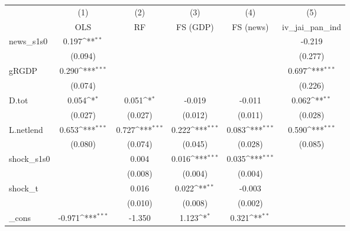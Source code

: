 {
\def\sym#1{\ifmmode^{#1}\else\(^{#1}\)\fi}
\begin{tabular}{l*{5}{c}}
\toprule
            &\multicolumn{1}{c}{(1)}&\multicolumn{1}{c}{(2)}&\multicolumn{1}{c}{(3)}&\multicolumn{1}{c}{(4)}&\multicolumn{1}{c}{(5)}\\
            &\multicolumn{1}{c}{OLS}&\multicolumn{1}{c}{RF}&\multicolumn{1}{c}{FS (GDP)}&\multicolumn{1}{c}{FS (news)}&\multicolumn{1}{c}{iv\_jai\_pan\_ind}\\
\midrule
news\_s1s0   &       0.197\sym{**} &                     &                     &                     &      -0.219         \\
            &     (0.094)         &                     &                     &                     &     (0.277)         \\
\addlinespace
gRGDP       &       0.290\sym{***}&                     &                     &                     &       0.697\sym{***}\\
            &     (0.074)         &                     &                     &                     &     (0.226)         \\
\addlinespace
D.tot       &       0.054\sym{*}  &       0.051\sym{*}  &      -0.019         &      -0.011         &       0.062\sym{**} \\
            &     (0.027)         &     (0.027)         &     (0.012)         &     (0.011)         &     (0.028)         \\
\addlinespace
L.netlend   &       0.653\sym{***}&       0.727\sym{***}&       0.222\sym{***}&       0.083\sym{***}&       0.590\sym{***}\\
            &     (0.080)         &     (0.074)         &     (0.045)         &     (0.028)         &     (0.085)         \\
\addlinespace
shock\_s1s0  &                     &       0.004         &       0.016\sym{***}&       0.035\sym{***}&                     \\
            &                     &     (0.008)         &     (0.004)         &     (0.004)         &                     \\
\addlinespace
shock\_t     &                     &       0.016         &       0.022\sym{**} &      -0.003         &                     \\
            &                     &     (0.010)         &     (0.008)         &     (0.002)         &                     \\
\addlinespace
\_cons      &      -0.971\sym{***}&      -1.350         &       1.123\sym{*}  &       0.321\sym{**} &                     \\

\end{tabular}}

